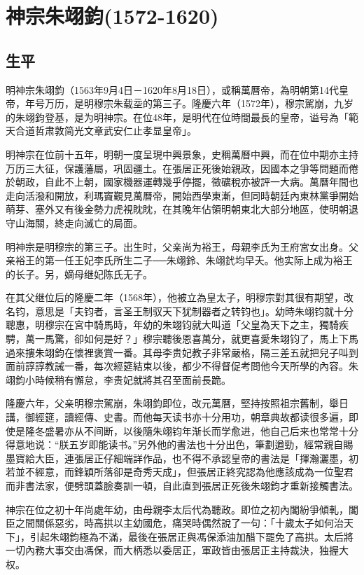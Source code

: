 
\section{神宗朱翊鈞\tiny(1572-1620)}

\subsection{生平}

明神宗朱翊鈞（1563年9月4日－1620年8月18日），或稱萬曆帝，為明朝第14代皇帝，年号万历，是明穆宗朱载坖的第三子。隆慶六年（1572年），穆宗駕崩，九岁的朱翊鈞登基，是为明神宗。在位48年，是明代在位時間最長的皇帝，谥号為「範天合道哲肃敦简光文章武安仁止孝显皇帝」。

明神宗在位前十五年，明朝一度呈現中興景象，史稱萬曆中興，而在位中期亦主持万历三大征，保護藩屬，巩固疆土。在張居正死後始親政，因國本之爭等問題而倦於朝政，自此不上朝，國家機器運轉幾乎停擺，徵礦稅亦被評一大病。萬曆年間也走向活潑和開放，利瑪竇覲見萬曆帝，開始西學東漸，但同時朝廷內東林黨爭開始萌芽、塞外又有後金勢力虎視眈眈，在其晚年佔領明朝東北大部分地區，使明朝退守山海關，終走向滅亡的局面。

明神宗是明穆宗的第三子。出生时，父亲尚为裕王，母親李氏为王府宮女出身。父亲裕王的第一任王妃李氏所生二子──朱翊鈴、朱翊釴均早夭。他实际上成为裕王的长子。另，嫡母继妃陈氏无子。

在其父继位后的隆慶二年（1568年），他被立為皇太子，明穆宗對其很有期望，改名钧，意思是「夫钧者，言圣王制驭天下犹制器者之转钧也」。幼時朱翊钧就十分聰惠，明穆宗在宮中騎馬時，年幼的朱翊钧就大叫道「父皇為天下之主，獨騎疾騁，萬一馬驚，卻如何是好？」穆宗聽後恩喜萬分，就更喜愛朱翊钧了，馬上下馬過來摟朱翊鈞在懷裡褒賞一番。其母李贵妃教子非常嚴格，隔三差五就把兒子叫到面前諄諄教誡一番，每次經筵結束以後，都少不得督促考問他今天所學的內容。朱翊鈞小時候稍有懈怠，李贵妃就將其召至面前長跪。

隆慶六年，父亲明穆宗駕崩，朱翊鈞即位，改元萬曆，堅持按照祖宗舊制，舉日講，御經筵，讀經傳、史書。而他每天读书亦十分用功，朝章典故都读很多遍，即使是隆冬盛暑亦从不间断，以後隨朱翊钧年渐长而学愈进，他自己后来也常常十分得意地说：“朕五岁即能读书。”另外他的書法也十分出色，筆劃遒勁，經常親自賜墨寶給大臣，連張居正仔細端詳作品，也不得不承認皇帝的書法是「揮瀚灑墨，初若並不經意，而鋒穎所落卻是奇秀天成」，但張居正終究認為他應該成為一位聖君而非書法家，便劈頭蓋臉奏訓一頓，自此直到張居正死後朱翊鈞才重新接觸書法。

神宗在位之初十年尚處年幼，由母親李太后代為聽政。即位之初內閣紛爭傾軋，閣臣之間關係惡劣，時高拱以主幼國危，痛哭時偶然說了一句：「十歲太子如何治天下」，引起朱翊鈞極為不滿，最後在張居正與馮保添油加醋下罷免了高拱。太后將一切內務大事交由馮保，而大柄悉以委居正，軍政皆由張居正主持裁決，独握大权。


